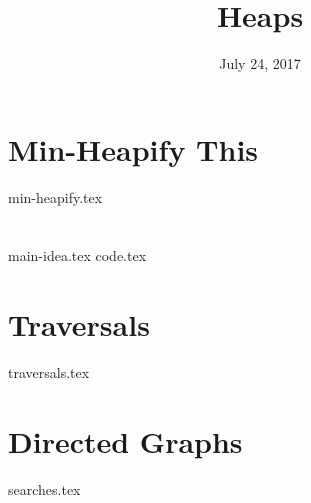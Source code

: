\documentclass{exam}
\title{Heaps}
\date{July 24, 2017}
\begin{document}
\maketitle

\section{Min-Heapify This}
\begin{questions}
{min-heapify.tex}
\end{questions}

\clearpage

\section{}
\begin{questions}
{main-idea.tex}
{code.tex}
\end{questions}

\clearpage

\section{Traversals}
\begin{questions}
{traversals.tex}
\end{questions}

\clearpage

\section{Directed Graphs}
\begin{questions}
{searches.tex}
\end{questions}
\end{document}
